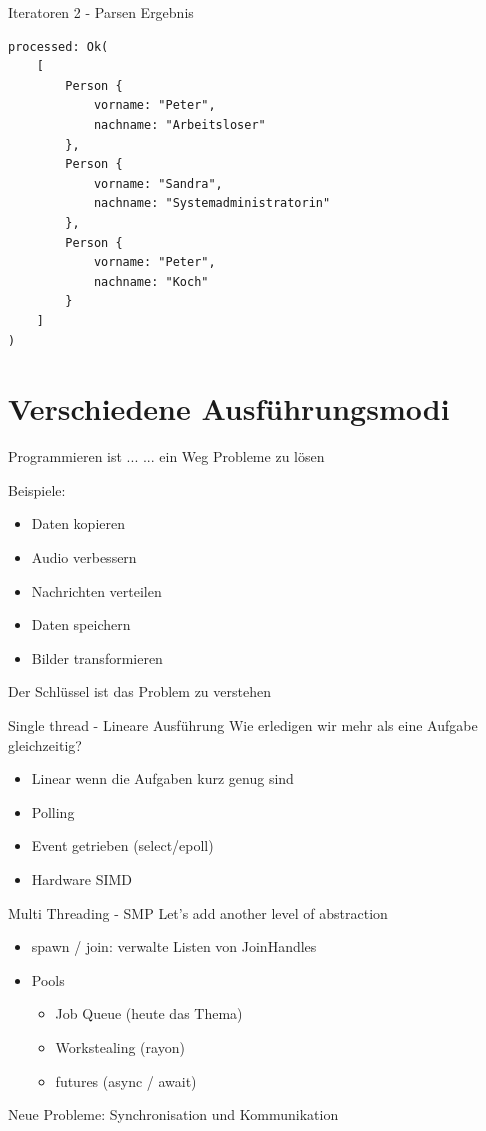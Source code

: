 \documentclass[aspectratio=1610,t]{beamer}
\begin{document}
\begin{frame}[fragile]{Iteratoren 2 - Parsen Ergebnis}
\begin{verbatim}
processed: Ok(
    [
        Person {
            vorname: "Peter",
            nachname: "Arbeitsloser"
        },
        Person {
            vorname: "Sandra",
            nachname: "Systemadministratorin"
        },
        Person {
            vorname: "Peter",
            nachname: "Koch"
        }
    ]
)
\end{verbatim}
\end{frame}



{
\section{Verschiedene Ausführungsmodi}
}

\begin{frame}[fragile]{Programmieren ist ...}
... ein Weg Probleme zu lösen

Beispiele:
\begin{itemize}
  \item Daten kopieren
  \item Audio verbessern
  \item Nachrichten verteilen
  \item Daten speichern
  \item Bilder transformieren
\end{itemize}

Der Schlüssel ist das Problem zu verstehen
\end{frame}

\begin{frame}[fragile]{Single thread - Lineare Ausführung}
Wie erledigen wir mehr als eine Aufgabe gleichzeitig?

\begin{itemize}
  \item Linear wenn die Aufgaben kurz genug sind
  \item Polling
  \item Event getrieben (select/epoll)
  \item Hardware SIMD
\end{itemize}
\end{frame}

\begin{frame}[fragile]{Multi Threading - SMP}
Let's add another level of abstraction
\begin{itemize}
  \item spawn / join: verwalte Listen von JoinHandles
  \item Pools \begin{itemize}
      \item Job Queue (heute das Thema)
      \item Workstealing (rayon)
      \item futures (async / await)
    \end{itemize}
\end{itemize}

Neue Probleme: Synchronisation und Kommunikation

\end{frame}
\end{document}
